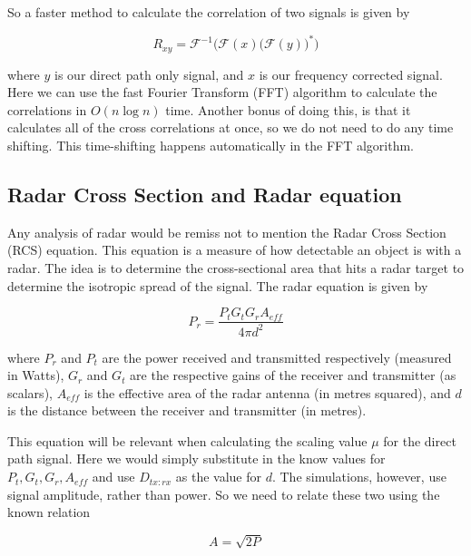 \documentclass[12pt,openany,a4paper]{book}
\begin{document}
\bigskip

So a faster method to calculate the correlation of two signals is given by

\begin{equation}
R_{xy} = \mathcal{F}^{-1} \Bigg( \mathcal{F}(x) \bigg(\mathcal{F}(y)\bigg)^* \Bigg)
\end{equation}

\bigskip

where $y$ is our direct path only signal, and $x$ is our frequency corrected signal. Here we can use the fast Fourier Transform (FFT) algorithm to calculate the correlations in $O (n \log n)$ time. Another bonus of doing this, is that it calculates all of the cross correlations at once, so we do not need to do any time shifting. This time-shifting happens automatically in the FFT algorithm.

\subsection{Radar Cross Section and Radar equation}
\label{sec:RCSeqn}
Any analysis of radar would be remiss not to mention the Radar Cross Section (RCS) equation. This equation is a measure of how detectable an object is with a radar. The idea is to determine the cross-sectional area that hits a radar target to determine the isotropic spread of the signal. The radar equation is given by

\begin{equation}
\label{eqn:rcs1}
P_r = \frac{P_tG_tG_rA_{eff}}{4\pi d^2}
\end{equation}

\bigskip

where $P_r$ and $P_t$ are the power received and transmitted respectively (measured in Watts), $G_r$ and $G_t$ are the respective gains of the receiver and transmitter (as scalars), $A_{eff}$ is the effective area of the radar antenna (in metres squared), and $d$ is the distance between the receiver and transmitter (in metres).

\bigskip

This equation will be relevant when calculating the scaling value $\mu$ for the direct path signal. Here we would simply substitute in the know values for $P_t,G_t,G_r,A_{eff}$ and use $D_{tx\colon rx}$ as the value for $d$. The simulations, however, use signal amplitude, rather than power. So we need to relate these two using the known relation

\begin{equation}
A = \sqrt{2P}
\end{equation}
\end{document}
